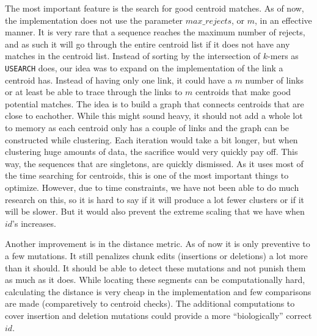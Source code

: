 The most important feature is the search for good centroid matches. As of now,
the implementation does not use the parameter $max\_rejects$, or $m$, in an
effective manner. It is very rare that a sequence reaches the maximum number
of rejects, and as such it will go through the entire centroid list if it does
not have any matches in the centroid list. Instead of sorting by the
intersection of $k$-mers as \texttt{USEARCH} does, our idea was to expand
on the implementation of the link a centroid has. Instead of having only one
link, it could have a $m$ number of links or at least be able to trace through
the links to $m$ centroids that make good potential matches. The idea is to
build a graph that connects centroids that are close to eachother. While this
might sound heavy, it should not add a whole lot to memory as each centroid
only has a couple of links and the graph can be constructed while clustering.
Each iteration would take a bit longer, but when clustering huge amounts of
data, the sacrifice would very quickly pay off. This way, the sequences that
are singletons, are quickly dismissed. As it uses most of the time searching
for centroids, this is one of the most important things to optimize. However,
due to time constraints, we have not been able to do much research on this, so
it is hard to say if it will produce a lot fewer clusters or if it will be
slower. But it would also prevent the extreme scaling that we have when $id$'s
increases.

Another improvement is in the distance metric. As of now it is only preventive
to a few mutations. It still penalizes chunk edits (insertions or deletions) a
lot more than it should. It should be able to detect these mutations and not
punish them as much as it does. While locating these segments can be
computationally hard, calculating the distance is very cheap in the
implementation and few comparisons are made (comparetively to centroid
checks). The additional computations to cover insertion and deletion mutations
could provide a more ``biologically'' correct $id$.
